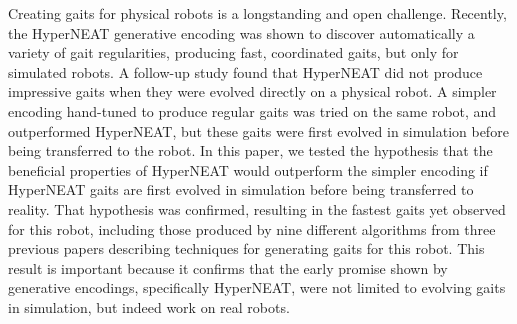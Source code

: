 Creating gaits for physical robots is a longstanding and open challenge. 
Recently, the HyperNEAT generative encoding was shown to discover automatically a variety of gait regularities, producing fast, coordinated gaits, but only for simulated robots. A follow-up study found that HyperNEAT did not produce impressive gaits when they were evolved directly on a physical robot. A simpler encoding hand-tuned to produce regular gaits was tried on the same robot, and outperformed HyperNEAT, but these gaits were first evolved in simulation before being transferred to the robot. In this paper, we tested the hypothesis that the beneficial properties of HyperNEAT would outperform the simpler encoding if HyperNEAT gaits are first evolved in simulation before being transferred to reality. 
That hypothesis was confirmed, resulting in the fastest gaits yet observed for this robot, including those produced by nine different algorithms from three previous papers describing techniques for generating gaits for this robot. This result is important because it confirms that the early promise shown by generative encodings, specifically HyperNEAT, were not limited to evolving gaits in simulation, but indeed work on real robots. 




%
